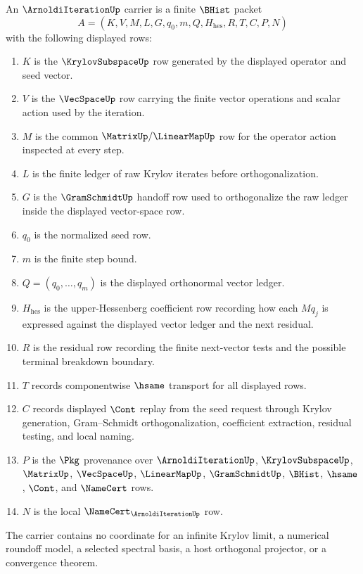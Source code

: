 \begin{definition}
\label{def:arnoldi-iteration-carrier}
An $\ArnoldiIterationUp$ carrier is a finite $\BHist$ packet
$$
A=(K,V,M,L,G,q_0,m,Q,H_{\mathrm{hes}},R,T,C,P,N)
$$
with the following displayed rows:
\begin{enumerate}
\item $K$ is the $\KrylovSubspaceUp$ row generated by the displayed operator and seed vector.
\item $V$ is the $\VecSpaceUp$ row carrying the finite vector operations and scalar action used by the iteration.
\item $M$ is the common $\MatrixUp/\LinearMapUp$ row for the operator action inspected at every step.
\item $L$ is the finite ledger of raw Krylov iterates before orthogonalization.
\item $G$ is the $\GramSchmidtUp$ handoff row used to orthogonalize the raw ledger inside the displayed vector-space row.
\item $q_0$ is the normalized seed row.
\item $m$ is the finite step bound.
\item $Q=(q_0,\ldots,q_m)$ is the displayed orthonormal vector ledger.
\item $H_{\mathrm{hes}}$ is the upper-Hessenberg coefficient row recording how each $Mq_j$ is expressed against the displayed vector ledger and the next residual.
\item $R$ is the residual row recording the finite next-vector tests and the possible terminal breakdown boundary.
\item $T$ records componentwise $\hsame$ transport for all displayed rows.
\item $C$ records displayed $\Cont$ replay from the seed request through Krylov generation, Gram--Schmidt orthogonalization, coefficient extraction, residual testing, and local naming.
\item $P$ is the $\Pkg$ provenance over $\ArnoldiIterationUp$, $\KrylovSubspaceUp$, $\MatrixUp$, $\VecSpaceUp$, $\LinearMapUp$, $\GramSchmidtUp$, $\BHist$, $\hsame$, $\Cont$, and $\NameCert$ rows.
\item $N$ is the local $\NameCert_{\ArnoldiIterationUp}$ row.
\end{enumerate}
The carrier contains no coordinate for an infinite Krylov limit, a numerical roundoff model, a selected spectral basis, a host orthogonal projector, or a convergence theorem.
\end{definition}

